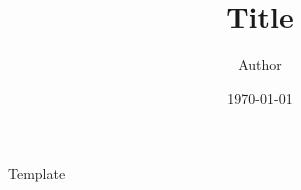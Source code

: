 \documentclass[
%
%
%
]{my_style}
\title{Title}
\author{Author}
\date{\today}
\begin{document}
 \maketitle       %
 \tableofcontents %

 Template
\end{document}
